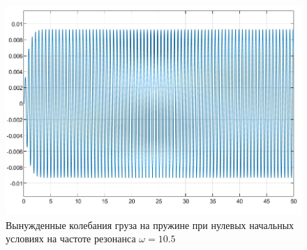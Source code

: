 \documentclass{article}
\begin{document}
	\begin{figure}[H]
		\centering
		\includegraphics[width=0.7\linewidth]{graph1}
		\caption{Вынужденные колебания груза на пружине при нулевых начальных условиях на частоте резонанса $\omega = 10.5$}
		\label{fig:graph1}
	\end{figure}
\end{document}
